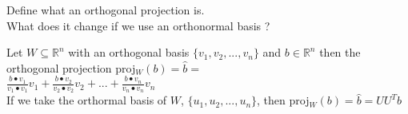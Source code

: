\documentclass[12pt]{article}
\newcommand*{\xfield}[1]{\begin{mdframed}\centering #1\end{mdframed}\bigskip}
\newenvironment{note}{}{}
\begin{document}
\begin{note}
	\xfield{Define what an orthogonal projection is.\\
	What does it change if we use an orthonormal basis ?}
	\xfield{Let $W \subseteq \mathbb{R}^n$ with an orthogonal basis $\{v_1,v_2,...,v_n\}$ and $b \in \mathbb{R}^n$ then the orthogonal projection proj$_W(b) = \hat{b} =$\\
	$\frac{b\bullet v_1}{v_1 \bullet v_1} v_1 + \frac{b\bullet v_2}{v_2 \bullet v_2} v_2 + ... + \frac{b\bullet v_n}{v_n \bullet v_n} v_n $\\
	If we take the orthormal basis of $W$, $\{u_1,u_2,...,u_n\}$, then proj$_W(b) = \hat{b} = UU^Tb$}
\end{note}
\end{document}
